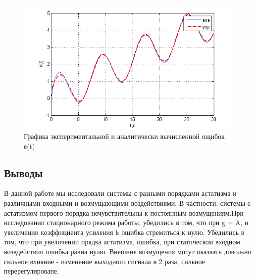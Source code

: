 \documentclass[a4paper, 12pt]{article}
\begin{document}
\begin{center}
	\begin{figure}[ht]
		\centering
			\includegraphics[width=0.95\linewidth]{17}
		\caption{Графика экспериментальной и аналитически вычисленной ощибок е(t)}
		\label{fig:17}
	\end{figure}
\end{center}
\clearpage
\begin{center}
	\section*{Выводы}
\end{center}

В данной работе мы исследовали системы с разными порядками астатизма и различными входными и возмущающими воздействиями. В частности, системы с астатизмом первого порядка нечувствительны к постоянным возмущениям.При исследовании стационарного режима работы, убедились в том, что при g = A, и увеличении коэффициента усиления k ошибка стремиться к нулю. 
Убедились в том, что при увеличении прядка астатизма, ошибка, при статическом входном возвдействии ошибка равна нулю.
Внешние возмущения могут оказвать довольно сильное влияние - изменение выходного сигнала в 2 раза, сильное перерегулироване.
\end{document}
